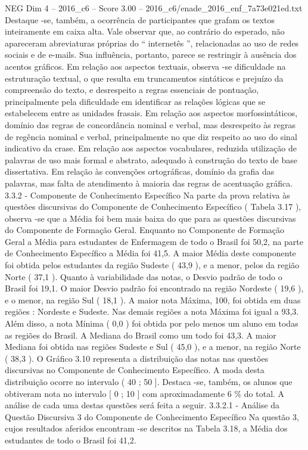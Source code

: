 \begin{textsample}{NEG Dim 4 – 2016\_c6 – Score 3.00 – 2016\_c6/enade\_2016\_enf\_7a73e021ed.txt}
Destaque -se, também, a ocorrência de participantes que grafam os textos inteiramente em caixa alta.
Vale observar que, ao contrário do esperado, não apareceram abreviaturas próprias do “ internetês ”, relacionadas ao uso de redes sociais e de e-mails.
Sua influência, portanto, parece se restringir à ausência dos acentos gráficos.
Em relação aos aspectos textuais, observa -se dificuldade na estruturação textual, o que resulta em truncamentos sintáticos e prejuízo da compreensão do texto, e desrespeito a regras essenciais de pontuação, principalmente pela dificuldade em identificar as relações lógicas que se estabelecem entre as unidades frasais.
Em relação aos aspectos morfossintáticos, domínio das regras de concordância nominal e verbal, mas desrespeito às regras de regência nominal e verbal, principalmente no que diz respeito ao uso do sinal indicativo da crase.
Em relação aos aspectos vocabulares, reduzida utilização de palavras de uso mais formal e abstrato, adequado à construção do texto de base dissertativa.
Em relação às convenções ortográficas, domínio da grafia das palavras, mas falta de atendimento à maioria das regras de acentuação gráfica. 3.3.2 - Componente de Conhecimento Específico Na parte da prova relativa às questões discursivas do Componente de Conhecimento Específico ( Tabela 3.17 ), observa -se que a Média foi bem mais baixa do que para as questões discursivas do Componente de Formação Geral.
Enquanto no Componente de Formação Geral a Média para estudantes de Enfermagem de todo o Brasil foi 50,2, na parte de Conhecimento Específico a Média foi 41,5.
A maior Média deste componente foi obtida pelos estudantes da região Sudeste ( 43,9 ), e a menor, pelos da região Norte ( 37,1 ).
Quanto à variabilidade das notas, o Desvio padrão de todo o Brasil foi 19,1.
O maior Desvio padrão foi encontrado na região Nordeste ( 19,6 ), e o menor, na região Sul ( 18,1 ).
A maior nota Máxima, 100, foi obtida em duas regiões : Nordeste e Sudeste.
Nas demais regiões a nota Máxima foi igual a 93,3.
Além disso, a nota Mínima ( 0,0 ) foi obtida por pelo menos um aluno em todas as regiões do Brasil.
A Mediana do Brasil como um todo foi 43,3.
A maior Mediana foi obtida nas regiões Sudeste e Sul ( 45,0 ), e a menor, na região Norte ( 38,3 ).
O Gráfico 3.10 representa a distribuição das notas nas questões discursivas no Componente de Conhecimento Específico.
A moda desta distribuição ocorre no intervalo ( 40 ; 50 ].
Destaca -se, também, os alunos que obtiveram nota no intervalo [ 0 ; 10 ] com aproximadamente 6 \% do total.
A análise de cada uma destas questões será feita a seguir. 3.3.2.1 - Análise da Questão Discursiva 3 do Componente de Conhecimento Específico Na questão 3, cujos resultados aferidos encontram -se descritos na Tabela 3.18, a Média dos estudantes de todo o Brasil foi 41,2.

\end{textsample}
